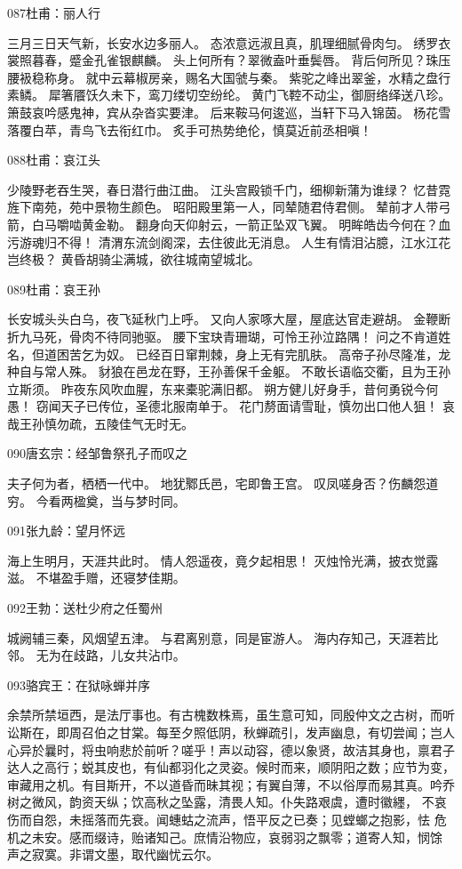 087杜甫：丽人行

三月三日天气新，长安水边多丽人。
态浓意远淑且真，肌理细腻骨肉匀。
绣罗衣裳照暮春，蹙金孔雀银麒麟。
头上何所有？翠微盍叶垂鬓唇。
背后何所见？珠压腰衱稳称身。
就中云幕椒房亲，赐名大国虢与秦。
紫驼之峰出翠釜，水精之盘行素鳞。
犀箸餍饫久未下，鸾刀缕切空纷纶。
黄门飞鞚不动尘，御厨络绎送八珍。
箫鼓哀吟感鬼神，宾从杂沓实要津。
后来鞍马何逡巡，当轩下马入锦茵。
杨花雪落覆白苹，青鸟飞去衔红巾。
炙手可热势绝伦，慎莫近前丞相嗔！

088杜甫：哀江头

少陵野老吞生哭，春日潜行曲江曲。
江头宫殿锁千门，细柳新蒲为谁绿？
忆昔霓旌下南苑，苑中景物生颜色。
昭阳殿里第一人，同辇随君侍君侧。
辇前才人带弓箭，白马嚼啮黄金勒。
翻身向天仰射云，一箭正坠双飞翼。
明眸皓齿今何在？血污游魂归不得！
清渭东流剑阁深，去住彼此无消息。
人生有情泪沾臆，江水江花岂终极？
黄昏胡骑尘满城，欲往城南望城北。

089杜甫：哀王孙

长安城头头白乌，夜飞延秋门上呼。
又向人家啄大屋，屋底达官走避胡。
金鞭断折九马死，骨肉不待同驰驱。
腰下宝玦青珊瑚，可怜王孙泣路隅！
问之不肯道姓名，但道困苦乞为奴。
已经百日窜荆棘，身上无有完肌肤。
高帝子孙尽隆准，龙种自与常人殊。
豺狼在邑龙在野，王孙善保千金躯。
不敢长语临交衢，且为王孙立斯须。
昨夜东风吹血腥，东来橐驼满旧都。
朔方健儿好身手，昔何勇锐今何愚！
窃闻天子已传位，圣德北服南单于。
花门剺面请雪耻，慎勿出口他人狙！
哀哉王孙慎勿疏，五陵佳气无时无。

090唐玄宗：经邹鲁祭孔子而叹之

夫子何为者，栖栖一代中。
地犹鄹氏邑，宅即鲁王宫。
叹凤嗟身否？伤麟怨道穷。
今看两楹奠，当与梦时同。

091张九龄：望月怀远

海上生明月，天涯共此时。
情人怨遥夜，竟夕起相思！
灭烛怜光满，披衣觉露滋。
不堪盈手赠，还寝梦佳期。

092王勃：送杜少府之任蜀州

城阙辅三秦，风烟望五津。
与君离别意，同是宦游人。
海内存知己，天涯若比邻。
无为在歧路，儿女共沾巾。

093骆宾王：在狱咏蝉并序

余禁所禁垣西，是法厅事也。有古槐数株焉，虽生意可知，同殷仲文之古树，而听
讼斯在，即周召伯之甘棠。每至夕照低阴，秋蝉疏引，发声幽息，有切尝闻；岂人
心异於曩时，将虫响悲於前听？嗟乎！声以动容，德以象贤，故洁其身也，禀君子
达人之高行；蜕其皮也，有仙都羽化之灵姿。候时而来，顺阴阳之数；应节为变，
审藏用之机。有目斯开，不以道昏而昧其视；有翼自薄，不以俗厚而易其真。吟乔
树之微风，韵资天纵；饮高秋之坠露，清畏人知。仆失路艰虞，遭时徽纆，
不哀伤而自怨，未摇落而先衰。闻蟪蛄之流声，悟平反之已奏；见螳螂之抱影，怯
危机之未安。感而缀诗，贻诸知己。庶情沿物应，哀弱羽之飘零；道寄人知，悯馀
声之寂寞。非谓文墨，取代幽忧云尔。

